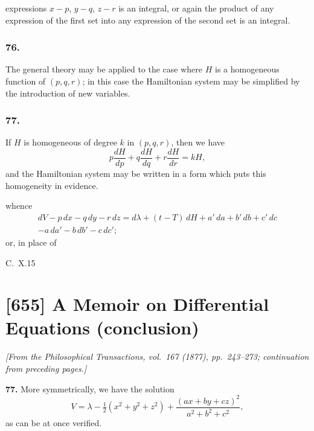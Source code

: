 \documentclass[11pt,a4paper]{book}
\begin{document}
expressions $x - p$, $y - q$, $z - r$ is an integral, or again the product of any expression of the first set into any expression of the second set is an integral.

\subsubsection*{76.}

The general theory may be applied to the case where $H$ is a homogeneous function of $(p, q, r)$; in this case the Hamiltonian system may be simplified by the introduction of new variables.

\subsubsection*{77.}

If $H$ is homogeneous of degree $k$ in $(p, q, r)$, then we have
\[
p\frac{dH}{dp} + q\frac{dH}{dq} + r\frac{dH}{dr} = kH,
\]
and the Hamiltonian system may be written in a form which puts this homogeneity in evidence.

\newpage
\setcounter{page}{150}

whence
\begin{multline}
dV - p\,dx - q\,dy - r\,dz = d\lambda + (t - T)\,dH + a'\,da + b'\,db + c'\,dc \\
- a\,da' - b\,db' - c\,dc';
\end{multline}
or, in place of

\medskip\noindent\textsc{C.~X.}\hfill 15
\clearpage


\thispagestyle{fancy}


\newpage

\section{[655] A Memoir on Differential Equations (conclusion)}
\label{sec:655}

\noindent\textit{[From the \emph{Philosophical Transactions}, vol.~167 (1877), pp.~243--273; continuation from preceding pages.]}

\medskip

\noindent\textbf{77.} More symmetrically, we have the solution
\[
V = \lambda - \tfrac{1}{2}(x^2 + y^2 + z^2) + \frac{(ax + by + cz)^2}{a^2 + b^2 + c^2},
\]
as can be at once verified.
\end{document}
